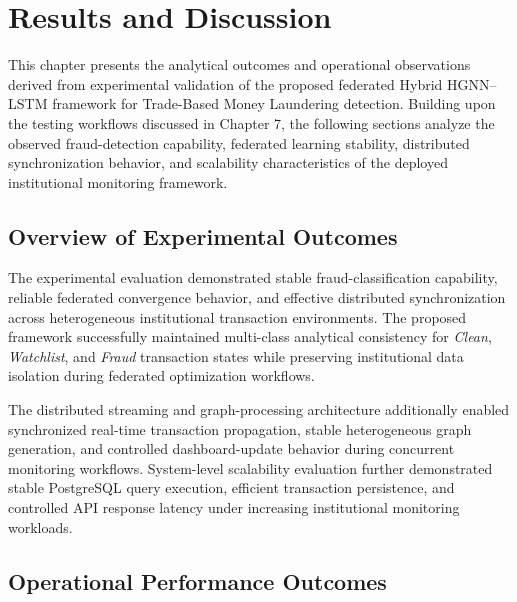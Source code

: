 \chapter{Results and Discussion}

This chapter presents the analytical outcomes and operational observations derived from experimental validation of the proposed federated Hybrid HGNN--LSTM framework for Trade-Based Money Laundering detection. Building upon the testing workflows discussed in Chapter 7, the following sections analyze the observed fraud-detection capability, federated learning stability, distributed synchronization behavior, and scalability characteristics of the deployed institutional monitoring framework.

\section[Overview of Experimental Outcomes]
{\textbf{Overview of Experimental Outcomes}}

The experimental evaluation demonstrated stable fraud-classification capability, reliable federated convergence behavior, and effective distributed synchronization across heterogeneous institutional transaction environments. The proposed framework successfully maintained multi-class analytical consistency for \textit{Clean}, \textit{Watchlist}, and \textit{Fraud} transaction states while preserving institutional data isolation during federated optimization workflows.

The distributed streaming and graph-processing architecture additionally enabled synchronized real-time transaction propagation, stable heterogeneous graph generation, and controlled dashboard-update behavior during concurrent monitoring workflows. System-level scalability evaluation further demonstrated stable PostgreSQL query execution, efficient transaction persistence, and controlled API response latency under increasing institutional monitoring workloads.

\section[Operational Performance Outcomes]
{\textbf{Operational Performance Outcomes}}

